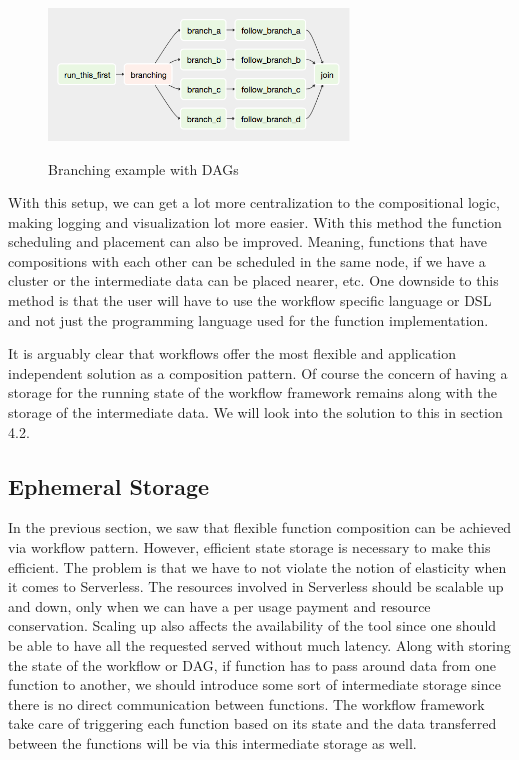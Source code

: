 \documentclass[12pt,titlepage]{article}
\begin{document}
\begin{figure}
\caption{Branching example with DAGs}
\centering
\includegraphics[width=80mm]{./thesis_images/workflow_1.png}
\label{fig:DAG}
\end{figure}

With this setup, we can get a lot more centralization to the compositional
logic, making logging and visualization lot more easier. With this method the
function scheduling and placement can also be improved. Meaning, functions that
have compositions with each other can be scheduled in the same node, if we have
a cluster or the intermediate data can be placed nearer, etc. One downside to
this method is that the user will have to use the workflow specific language or
DSL and not just the programming language used for the function implementation.


It is arguably clear that workflows offer the most flexible and application
independent solution as a composition pattern. Of course the concern of having a
storage for the running state of the workflow framework remains along with the
storage of the intermediate data. We will look into the solution to this in
section 4.2.


\subsection{Ephemeral Storage}
\label{sec:org506a975}

In the previous section, we saw that flexible function composition can be
achieved via workflow pattern. However, efficient state storage is necessary to make this efficient.
The problem is that we have to not violate the notion of elasticity
when it comes to Serverless. The resources involved in Serverless should be
scalable up and down, only when we can have a per usage payment and resource
conservation. Scaling up also affects the availability of the tool since one
should be able to have all the requested served without much latency. Along with
storing the state of the workflow or DAG, if function has to pass around data
from one function to another, we should introduce some sort of intermediate
storage since there is no direct communication between functions. The workflow
framework take care of triggering each function based on its state and the data
transferred between the functions will be via this intermediate storage as well.
\end{document}
